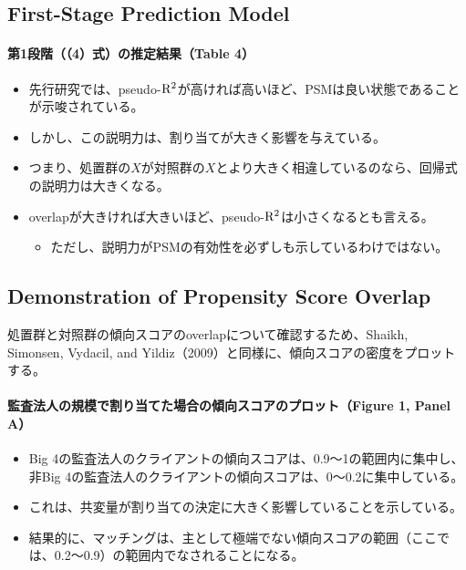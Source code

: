 \subsection*{First-Stage Prediction Model}

\paragraph{第1段階（（4）式）の推定結果（Table 4）}

\begin{itemize}
 \item 先行研究では、pseudo-${\rm R^2}$が高ければ高いほど、PSMは良い状態であることが示唆されている。
 \item しかし、この説明力は、割り当てが大きく影響を与えている。
 \item つまり、処置群の$X$が対照群の$X$とより大きく相違しているのなら、回帰式の説明力は大きくなる。
 \item overlapが大きければ大きいほど、pseudo-${\rm R^2}$は小さくなるとも言える。
  \begin{itemize}
   \item ただし、説明力がPSMの有効性を必ずしも示しているわけではない。
  \end{itemize}
\end{itemize}

\subsection*{Demonstration of Propensity Score Overlap}

処置群と対照群の傾向スコアのoverlapについて確認するため、Shaikh, Simonsen, Vydacil, and Yildiz（2009）と同様に、傾向スコアの密度をプロットする。

\paragraph{監査法人の規模で割り当てた場合の傾向スコアのプロット（Figure 1, Panel A）}

\begin{itemize}
 \item Big 4の監査法人のクライアントの傾向スコアは、0.9〜1の範囲内に集中し、非Big 4の監査法人のクライアントの傾向スコアは、0〜0.2に集中している。
 \item これは、共変量が割り当ての決定に大きく影響していることを示している。
 \item 結果的に、マッチングは、主として極端でない傾向スコアの範囲（ここでは、0.2〜0.9）の範囲内でなされることになる。
\end{itemize}

